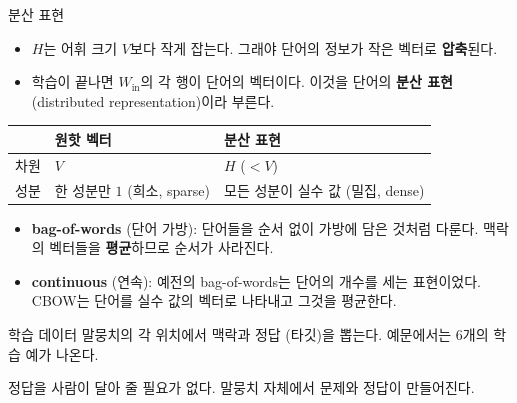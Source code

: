 \documentclass[aspectratio=169,11pt]{beamer}
\begin{document}
\begin{frame}{분산 표현}
\begin{itemize}
\item $H$는 어휘 크기 $V$보다 작게 잡는다. 그래야 단어의 정보가 작은 벡터로 \textbf{압축}된다.
\item 학습이 끝나면 $W_{\text{in}}$의 각 행이 단어의 벡터이다. 이것을 단어의 \textbf{분산 표현} (distributed representation)이라 부른다.
\end{itemize}
\begin{center}
\small
\begin{tabular}{@{}lll@{}}
\toprule
& 원핫 벡터 & 분산 표현 \\
\midrule
차원 & $V$ & $H$ ($<V$) \\
성분 & 한 성분만 $1$ (희소, sparse) & 모든 성분이 실수 값 (밀집, dense) \\
\bottomrule
\end{tabular}
\end{center}
\begin{remarkbox}
\small
\begin{itemize}
\item \textbf{bag-of-words} (단어 가방): 단어들을 순서 없이 가방에 담은 것처럼 다룬다.
맥락의 벡터들을 \textbf{평균}하므로 순서가 사라진다.
\item \textbf{continuous} (연속): 예전의 bag-of-words는 단어의 개수를 세는 표현이었다.
CBOW는 단어를 실수 값의 벡터로 나타내고 그것을 평균한다.
\end{itemize}
\end{remarkbox}
\end{frame}

\begin{frame}{학습 데이터}
말뭉치의 각 위치에서 맥락과 정답 (타깃)을 뽑는다. 예문에서는 $6$개의 학습 예가 나온다.
\vskip1mm
\begin{keybox}
정답을 사람이 달아 줄 필요가 없다. 말뭉치 자체에서 문제와 정답이 만들어진다.
\end{keybox}
\end{frame}
\end{document}
